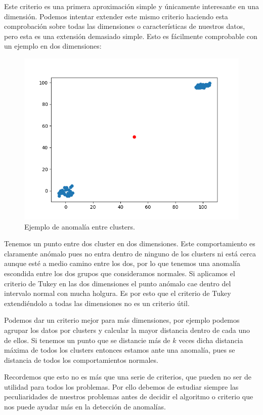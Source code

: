 Este criterio es una primera aproximación simple y únicamente interesante en una dimensión. Podemos intentar extender este mismo criterio haciendo esta comprobación sobre todas las dimensiones o características de nuestros datos, pero esta es una extensión demasiado simple. Esto es fácilmente comprobable con un ejemplo en dos dimensiones:

\begin{figure}[H]
	\centering
	\includegraphics[scale=0.5]{imagenes/outlier_cluster.png}
	\caption{Ejemplo de anomalía entre clusters.}
	\label{img:outlier-cluster}
\end{figure}

Tenemos un punto entre dos cluster en dos dimensiones. Este comportamiento es claramente anómalo pues no entra dentro de ninguno de los clusters ni está cerca aunque esté a medio camino entre los dos, por lo que tenemos una anomalía escondida entre los dos grupos que consideramos normales. Si aplicamos el criterio de Tukey en las dos dimensiones el punto anómalo cae dentro del intervalo normal con mucha holgura. Es por esto que el criterio de Tukey extendiéndolo a todas las dimensiones no es un criterio útil.

Podemos dar un criterio mejor para más dimensiones, por ejemplo podemos agrupar los datos por clusters y calcular la mayor distancia dentro de cada uno de ellos. Si tenemos un punto que se distancie más de $k$ veces dicha distancia máxima de todos los clusters entonces estamos ante una anomalía, pues se distancia de todos los comportamientos normales.

Recordemos que esto no es más que una serie de criterios, que pueden no ser de utilidad para todos los problemas. Por ello debemos de estudiar siempre las peculiaridades de nuestros problemas antes de decidir el algoritmo o criterio que nos puede ayudar más en la detección de anomalías.

